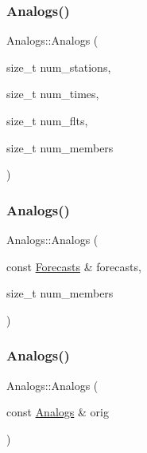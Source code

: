 \mbox{\label{class_analogs_ab8fda7c92e8685f0be660ecdf7bf32a3}} 
\subsubsection{\texorpdfstring{Analogs()}{Analogs()}\hspace{0.1cm}{\footnotesize\ttfamily [2/4]}}
{\footnotesize\ttfamily Analogs\+::\+Analogs (\begin{DoxyParamCaption}\item[{size\+\_\+t}]{num\+\_\+stations,  }\item[{size\+\_\+t}]{num\+\_\+times,  }\item[{size\+\_\+t}]{num\+\_\+flts,  }\item[{size\+\_\+t}]{num\+\_\+members }\end{DoxyParamCaption})}

\mbox{\label{class_analogs_a8e13e48e4097462f1ff324fa62c6481c}} 
\subsubsection{\texorpdfstring{Analogs()}{Analogs()}\hspace{0.1cm}{\footnotesize\ttfamily [3/4]}}
{\footnotesize\ttfamily Analogs\+::\+Analogs (\begin{DoxyParamCaption}\item[{const \mbox{\hyperlink{class_forecasts}{Forecasts}} \&}]{forecasts,  }\item[{size\+\_\+t}]{num\+\_\+members }\end{DoxyParamCaption})}

\mbox{\label{class_analogs_af4174aafbd1d9d21cc4ea9ee3ab62dfd}} 
\subsubsection{\texorpdfstring{Analogs()}{Analogs()}\hspace{0.1cm}{\footnotesize\ttfamily [4/4]}}
{\footnotesize\ttfamily Analogs\+::\+Analogs (\begin{DoxyParamCaption}\item[{const \mbox{\hyperlink{class_analogs}{Analogs}} \&}]{orig }\end{DoxyParamCaption})\hspace{0.3cm}{\ttfamily [delete]}}

